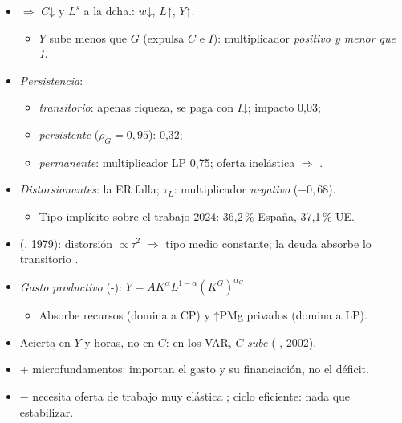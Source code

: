 \documentclass{article}
\begin{document}
\begin{columnas}
\begin{itemize}
\begin{itemize}
  \end{itemize}
\end{itemize}
\begin{itemize}
\item {} $\Rightarrow$ $C$↓ y $L^s$ a la dcha.: $w$↓, $L$↑, $Y$↑.
  \begin{itemize}
  \item $Y$ sube menos que $G$ (expulsa $C$ e $I$): multiplicador \emph{positivo y menor que 1}.
  \end{itemize}
\item \emph{Persistencia}:
  \begin{itemize}
  \item \emph{transitorio}: apenas riqueza, se paga con $I$↓; impacto 0,03;
  \item \emph{persistente} ($\rho_G=0{,}95$): 0,32;
  \item \emph{permanente}: multiplicador LP 0,75; oferta inelástica $\Rightarrow$ .
  \end{itemize}
\end{itemize}
\begin{itemize}
\item \emph{Distorsionantes}: la ER falla; $\tau_L$: multiplicador \emph{negativo} ($-0{,}68$).
  \begin{itemize}
  \item Tipo implícito sobre el trabajo 2024: 36,2\,\% España, 37,1\,\% UE.
  \end{itemize}
\item {} (, 1979): distorsión $\propto\tau^2$ $\Rightarrow$ tipo medio constante; la deuda absorbe lo transitorio .
\item \emph{Gasto productivo} (-): $Y=AK^{\alpha}L^{1-\alpha}(K^G)^{\alpha_G}$.
  \begin{itemize}
  \item Absorbe recursos (domina a CP) y ↑PMg privados (domina a LP).
  \end{itemize}
\end{itemize}
\begin{itemize}
\item Acierta en $Y$ y horas, no en $C$: en los VAR, $C$ \emph{sube} (-, 2002).
\item + microfundamentos: importan el gasto y su financiación, no el déficit.
\item $-$ necesita oferta de trabajo muy elástica ; ciclo eficiente: nada que estabilizar.
\end{itemize}


\end{columnas}
\end{document}
